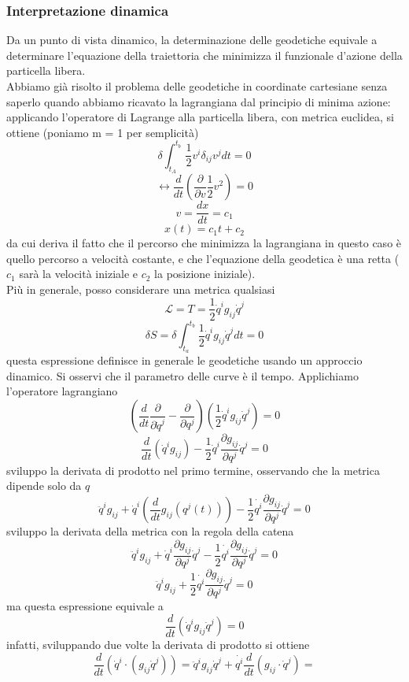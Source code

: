 \documentclass[
10pt, %
a4paper, %
oneside, %
headinclude,footinclude, %
BCOR5mm, %
]{scrartcl}
\begin{document}
\subsubsection{Interpretazione dinamica}
Da un punto di vista dinamico, la determinazione delle geodetiche equivale a determinare l'equazione della traiettoria che minimizza il funzionale d'azione della particella libera.\\
Abbiamo già risolto il problema delle geodetiche in coordinate cartesiane senza saperlo quando abbiamo ricavato la lagrangiana dal principio di minima azione: applicando l'operatore di Lagrange alla particella libera, con metrica euclidea, si ottiene (poniamo m = 1 per semplicità)
\[\delta\int_{t_A}^{t_b}\frac{1}{2} v^i\delta_{ij}v^jdt = 0\]
\[\leftrightarrow \frac{d}{dt}\left(\frac{\partial}{\partial v}\frac{1}{2} v^2\right) = 0\]
\[v= \frac{dx}{dt} = c_1\]
\[x(t) = c_1 t + c_2 \]
da cui deriva il fatto che il percorso che minimizza la lagrangiana in questo caso è quello percorso a velocità costante, e che l'equazione della geodetica è una retta (\(c_1\) sarà la velocità iniziale e \(c_2\) la posizione iniziale).\\
Più in generale, posso considerare una metrica qualsiasi
\[\mathcal{L} = T =\frac{1}{2}\dot{q}^ig_{ij}\dot{q}^j\]
\[\delta S = \delta \int_{t_a}^{t_b}\frac{1}{2}\dot{q}^ig_{ij}\dot{q}^j dt =0 \]
questa espressione definisce in generale le geodetiche usando un approccio dinamico. Si osservi che il parametro delle curve è il tempo. Applichiamo l'operatore lagrangiano
\[\left(\frac{d}{dt}\frac{\partial }{\partial \dot{q}^j}-\frac{\partial }{\partial q^j}\right)\left(\frac{1}{2}\dot{q}^ig_{ij}\dot{q}^j\right) = 0\]
\[\frac{d}{dt}\left(\dot{q}^ig_{ij}\right)-\frac{1}{2}\dot{q}^i\frac{\partial g_{ij}}{\partial q^j}\dot{q}^j = 0\]
sviluppo la derivata di prodotto nel primo termine, osservando che la metrica dipende solo da \(q\)
\[\ddot{q}^ig_{ij}+ \dot{q}^i\left(\frac{d}{dt}g_{ij}(q^j(t))\right)-\frac{1}{2}\dot{q^i}\frac{\partial g_{ij}}{\partial q^j}\dot{q}^j = 0\]
sviluppo la derivata della metrica con la regola della catena
\[\ddot{q}^ig_{ij}+ \dot{q}^i\frac{\partial g_{ij}}{\partial q^j}\dot{q}^j-\frac{1}{2}\dot{q^i}\frac{\partial g_{ij}}{\partial q^j}\dot{q}^j = 0\]
\[\ddot{q}^ig_{ij}+\frac{1}{2}\dot{q^i}\frac{\partial g_{ij}}{\partial q^j}\dot{q}^j= 0\]
ma questa espressione equivale a
\[\frac{d}{dt}\left(\dot{q}^ig_{ij}\dot{q}^j\right) = 0\]
infatti, sviluppando due volte la derivata di prodotto si ottiene
\[\frac{d}{dt}\left(\dot{q}^i\cdot(g_{ij}\dot{q}^j)\right) = \ddot{q}^ig_{ij}\dot{q}^j + \dot{q^i}\frac{d}{dt}\left( g_{ij}\cdot \dot{q}^j \right) = \]
\end{document}
